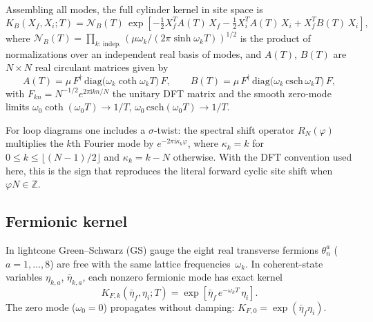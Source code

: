 \documentclass[11pt]{article}
\newcommand{\ZZ}{\mathbb{Z}}
\newcommand{\ii}{\mathrm{i}}
\begin{document}
Assembling all modes, the full cylinder kernel in site space is
\begin{equation}
K_B(X_f, X_i; T) = \mathcal{N}_B(T)\,
\exp\!\left[-\tfrac{1}{2}X_f^T A(T)\,X_f - \tfrac{1}{2}X_i^T A(T)\,X_i + X_f^T B(T)\,X_i\right],
\label{eq:site-kernel}
\end{equation}
where $\mathcal{N}_B(T) = \prod_{k:\,\text{indep.}}(\mu\omega_k/(2\pi\sinh\omega_k T))^{1/2}$ is the product of normalizations over an independent real basis of modes, and $A(T)$, $B(T)$ are $N \times N$ real circulant matrices given by
\begin{equation}
A(T) = \mu\,F^\dagger\,\mathrm{diag}\!\bigl(\omega_k\coth\omega_k T\bigr)\,F,
\qquad
B(T) = \mu\,F^\dagger\,\mathrm{diag}\!\bigl(\omega_k\,\mathrm{csch}\,\omega_k T\bigr)\,F,
\label{eq:AB}
\end{equation}
with $F_{kn} = N^{-1/2}e^{2\pi\ii kn/N}$ the unitary DFT matrix and the smooth zero-mode limits $\omega_0\coth(\omega_0 T) \to 1/T$, $\omega_0\,\mathrm{csch}(\omega_0 T) \to 1/T$.

For loop diagrams one includes a $\sigma$-twist: the spectral shift operator $R_N(\varphi)$ multiplies the $k$th Fourier mode by $e^{-2\pi\ii\kappa_k\varphi}$, where $\kappa_k = k$ for $0 \le k \le \lfloor(N-1)/2\rfloor$ and $\kappa_k = k - N$ otherwise. With the DFT convention used here, this is the sign that reproduces the literal forward cyclic site shift when $\varphi N\in\ZZ$.

\subsection{Fermionic kernel}

In lightcone Green--Schwarz (GS) gauge the eight real transverse fermions $\theta^a_n$ ($a = 1, \dots, 8$) are free with the same lattice frequencies~$\omega_k$. In coherent-state variables $\eta_{k,a}$, $\bar\eta_{k,a}$, each nonzero fermionic mode has exact kernel
\begin{equation}
K_{F,k}(\bar\eta_f, \eta_i; T) = \exp\!\left[\bar\eta_f\,e^{-\omega_k T}\,\eta_i\right].
\label{eq:ferm-kernel}
\end{equation}
The zero mode ($\omega_0 = 0$) propagates without damping: $K_{F,0} = \exp(\bar\eta_f\eta_i)$.
\end{document}
